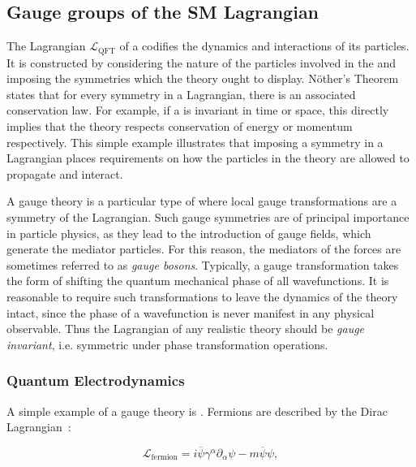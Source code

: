 \subsection{Gauge groups of the SM Lagrangian}
\label{sec:th:gauge}

The Lagrangian $\mathcal{L}_{\text{QFT}}$ of a \QFT codifies the dynamics and interactions of its particles. %
It is constructed by considering the nature of the particles involved in the \QFT and imposing the symmetries which the theory ought to display. N\"other's Theorem~\cite{Noether} states that for every symmetry in a Lagrangian, there is an associated conservation law. For example, if a \QFT is invariant in time or space, this directly implies that the theory respects conservation of energy or momentum respectively. This simple example illustrates that imposing a symmetry in a Lagrangian places requirements on how the particles in the theory are allowed to propagate and interact. 

A gauge theory is a particular type of \QFT where local gauge transformations are a symmetry of the Lagrangian. Such gauge symmetries are of principal importance in particle physics, as they lead to the introduction of gauge fields, which generate the mediator particles. For this reason, the mediators of the forces are sometimes referred to as \emph{gauge bosons}. 
Typically, a gauge transformation takes the form of shifting the quantum mechanical phase of all wavefunctions. It is reasonable to require such transformations to leave the dynamics of the theory intact, since the phase of a wavefunction is never manifest in any physical observable. Thus the Lagrangian of any realistic theory should be \emph{gauge invariant}, i.e. symmetric under phase transformation operations.  

\subsubsection{Quantum Electrodynamics}
\label{sec:th:qed}
A simple example of a gauge theory is \QED. 
Fermions are described by the Dirac Lagrangian~\cite{griffiths2008introduction}:

\begin{equation}
\label{eq:th:dirac}
\mathcal{L}_{\textrm{fermion}} = i\overline{\psi} \gamma^{\alpha} \partial_{\alpha} \psi - m\overline{\psi}\psi,
\end{equation}

